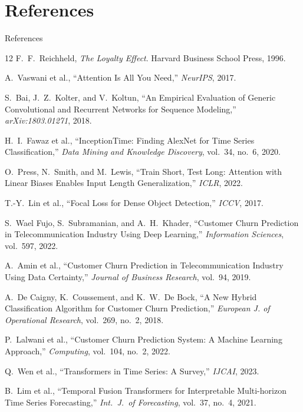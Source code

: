 \documentclass[aspectratio=169,11pt]{beamer}
\begin{document}
\section*{References}

\begin{frame}[allowframebreaks]{References}
\scriptsize
\begin{thebibliography}{12}
 F.\ F.\ Reichheld, \emph{The Loyalty Effect}. Harvard Business School Press, 1996.

 A.\ Vaswani et al., ``Attention Is All You Need,'' \emph{NeurIPS}, 2017.

 S.\ Bai, J.\ Z.\ Kolter, and V.\ Koltun, ``An Empirical Evaluation of Generic Convolutional and Recurrent Networks for Sequence Modeling,'' \emph{arXiv:1803.01271}, 2018.

 H.\ I.\ Fawaz et al., ``InceptionTime: Finding AlexNet for Time Series Classification,'' \emph{Data Mining and Knowledge Discovery}, vol.\ 34, no.\ 6, 2020.

 O.\ Press, N.\ Smith, and M.\ Lewis, ``Train Short, Test Long: Attention with Linear Biases Enables Input Length Generalization,'' \emph{ICLR}, 2022.

 T.-Y.\ Lin et al., ``Focal Loss for Dense Object Detection,'' \emph{ICCV}, 2017.

 S.\ Wael Fujo, S.\ Subramanian, and A.\ H.\ Khader, ``Customer Churn Prediction in Telecommunication Industry Using Deep Learning,'' \emph{Information Sciences}, vol.\ 597, 2022.

 A.\ Amin et al., ``Customer Churn Prediction in Telecommunication Industry Using Data Certainty,'' \emph{Journal of Business Research}, vol.\ 94, 2019.

 A.\ De Caigny, K.\ Coussement, and K.\ W.\ De Bock, ``A New Hybrid Classification Algorithm for Customer Churn Prediction,'' \emph{European J. of Operational Research}, vol.\ 269, no.\ 2, 2018.

 P.\ Lalwani et al., ``Customer Churn Prediction System: A Machine Learning Approach,'' \emph{Computing}, vol.\ 104, no.\ 2, 2022.

 Q.\ Wen et al., ``Transformers in Time Series: A Survey,'' \emph{IJCAI}, 2023.

 B.\ Lim et al., ``Temporal Fusion Transformers for Interpretable Multi-horizon Time Series Forecasting,'' \emph{Int.\ J.\ of Forecasting}, vol.\ 37, no.\ 4, 2021.
\end{thebibliography}
\end{frame}
\end{document}
